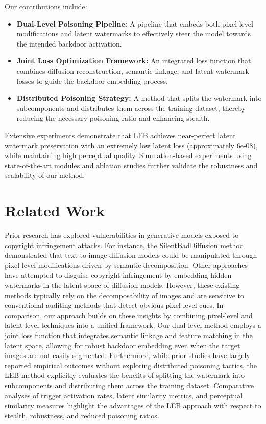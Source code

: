 \documentclass{article} %
\begin{document}
Our contributions include:
\begin{itemize}
  \item \textbf{Dual-Level Poisoning Pipeline:} A pipeline that embeds both pixel-level modifications and latent watermarks to effectively steer the model towards the intended backdoor activation.
  \item \textbf{Joint Loss Optimization Framework:} An integrated loss function that combines diffusion reconstruction, semantic linkage, and latent watermark losses to guide the backdoor embedding process.
  \item \textbf{Distributed Poisoning Strategy:} A method that splits the watermark into subcomponents and distributes them across the training dataset, thereby reducing the necessary poisoning ratio and enhancing stealth.
\end{itemize}

Extensive experiments demonstrate that LEB achieves near-perfect latent watermark preservation with an extremely low latent loss (approximately 6e-08), while maintaining high perceptual quality. Simulation-based experiments using state-of-the-art modules and ablation studies further validate the robustness and scalability of our method.

\section{Related Work}
\label{sec:related}
Prior research has explored vulnerabilities in generative models exposed to copyright infringement attacks. For instance, the SilentBadDiffusion method\citep{Blei2017} demonstrated that text-to-image diffusion models could be manipulated through pixel-level modifications driven by semantic decomposition. Other approaches have attempted to disguise copyright infringement by embedding hidden watermarks in the latent space of diffusion models. However, these existing methods typically rely on the decomposability of images and are sensitive to conventional auditing methods that detect obvious pixel-level cues. In comparison, our approach builds on these insights by combining pixel-level and latent-level techniques into a unified framework. Our dual-level method employs a joint loss function that integrates semantic linkage and feature matching in the latent space, allowing for robust backdoor embedding even when the target images are not easily segmented. Furthermore, while prior studies have largely reported empirical outcomes without exploring distributed poisoning tactics, the LEB method explicitly evaluates the benefits of splitting the watermark into subcomponents and distributing them across the training dataset. Comparative analyses of trigger activation rates, latent similarity metrics, and perceptual similarity measures highlight the advantages of the LEB approach with respect to stealth, robustness, and reduced poisoning ratios.
\end{document}
